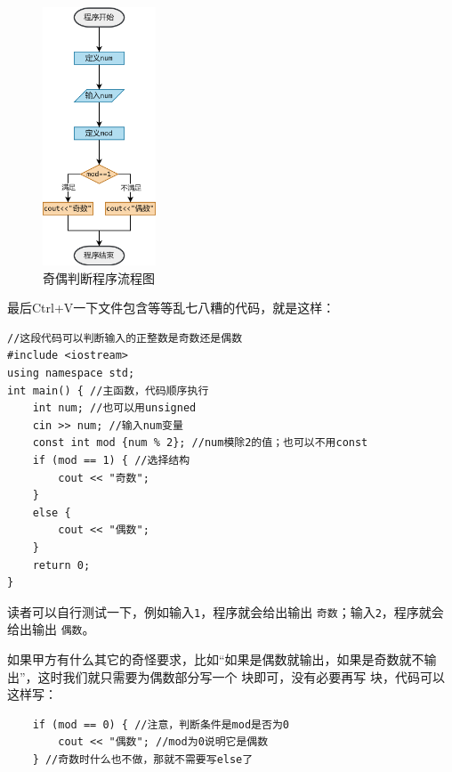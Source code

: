     \begin{figure}[htbp]
        \centering
        \includegraphics[width=0.3\textwidth]{../images/generalized_parts/03_structure_of_odd_or_even_300.png}
        \caption{奇偶判断程序流程图}
    \end{figure}
最后Ctrl+V一下文件包含等等乱七八糟的代码，就是这样：
\begin{lstlisting}[caption=\texttt{odd\_or\_even.cpp},label=lst:oddoreven]
//这段代码可以判断输入的正整数是奇数还是偶数
#include <iostream>
using namespace std;
int main() { //主函数，代码顺序执行
    int num; //也可以用unsigned
    cin >> num; //输入num变量
    const int mod {num % 2}; //num模除2的值；也可以不用const
    if (mod == 1) { //选择结构
    	cout << "奇数";
    }
    else {
    	cout << "偶数";
    }
    return 0;
}
\end{lstlisting}
读者可以自行测试一下，例如输入\texttt{1}，程序就会给出输出 \texttt{奇数}；输入\texttt{2}，程序就会给出输出 \texttt{偶数}。\par
如果甲方有什么其它的奇怪要求，比如``如果是偶数就输出，如果是奇数就不输出''，这时我们就只需要为偶数部分写一个 \lstinline@if@ 块即可，没有必要再写 \lstinline@else@ 块，代码可以这样写：
\begin{lstlisting}
    if (mod == 0) { //注意，判断条件是mod是否为0
        cout << "偶数"; //mod为0说明它是偶数
    } //奇数时什么也不做，那就不需要写else了
\end{lstlisting}
